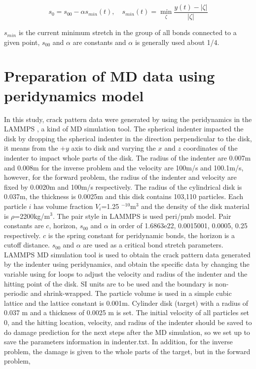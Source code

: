  \begin{equation}
s_0=s_{00}-\alpha s_{min}(t), \quad s_{min}(t)=\min_\zeta{\frac{y(t)-|\zeta|}{|\zeta|}}
\end{equation}

$s_{min}$ is the current minimum stretch in the group of all bonds connected to a given point, $s_{00}$ and $\alpha$ are constants and $\alpha$ is generally used about 1/4. 

\section{Preparation of MD data using peridynamics model }
\label{sec:3}

In this study, crack pattern data were generated by using the peridynamics in the LAMMPS \cite{Ref15}, a kind of MD simulation tool.
The spherical indenter impacted the disk by dropping the spherical indenter in the direction perpendicular to the disk, it means from the ${+y}$ axis to disk and varying the $x$ and $z$ coordinates of the indenter to impact whole parts of the disk. The radius of the indenter are 0.007m and 0.008m for the inverse problem and the velocity are 100m/s and 100.1m/s, however, for the forward problem, the radius of the indenter and velocity are fixed by 0.0020m and 100m/s respectively. The radius of the cylindrical disk is 0.037m, the thickness is 0.0025m and this disk contains 103,110 particles. Each particle $i$ has volume fraction $V_i$=1.25 $^{-10}$m$^3$ and the density of the disk material is $\rho$=2200kg/m$^3$. The pair style in LAMMPS is used peri/pmb model. Pair constants are $c$, horizon, $s_{00}$ and $\alpha$ in order of 1.6863e22, 0.0015001, 0.0005, 0.25 respectively. $c$ is the spring constant for peridynamic bonds, the horizon is a cutoff distance. $s_{00}$ and $\alpha$ are used as a critical bond stretch parameters. LAMMPS MD simulation tool is used to obtain the crack pattern data generated by the indenter using peridynamics, and obtain the specific data by changing the variable using for loops to adjust the velocity and radius of the indenter and the hitting point of the disk. SI units are to be used and the boundary is non-periodic and shrink-wrapped. The particle volume is used in a simple cubic lattice and the lattice constant is 0.001m. Cylinder disk (target) with a radius of 0.037 m and a thickness of 0.0025 m is set. The initial velocity of all particles set 0, and the hitting location, velocity, and radius of the indenter should be saved to do damage prediction for the next steps after the MD simulation, so we set up to save the parameters information in indenter.txt. In addition, for the inverse problem, the damage is given to the whole parts of the target, but in the forward problem, 